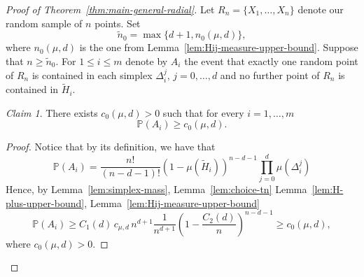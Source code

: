 \documentclass[10pt]{amsart}
\newcommand{\1}{\textbf{1}}
\numberwithin{equation}{section} %
\theoremstyle{remark}
\newtheorem{claim}{Claim}
\theoremstyle{definition}
\begin{document}
\begin{proof}[Proof of Theorem~\ref{thm:main-general-radial}]
Let $R_n=\{X_1,\ldots,X_n\}$ denote our random sample of $n$ points. Set \[\widetilde{n}_0= \max\{d+1,n_0(\mu,d)\},\] where $n_0(\mu,d)$ is the one from Lemma~\ref{lem:Hij-measure-upper-bound}. Suppose that $n \geq \widetilde{n}_0$. For $1 \leq i \leq m$ denote by $A_i$ the event that exactly one random point of $R_n$ is contained in each simplex $\Delta_i^j, \, j=0,\ldots,d$ and no further point of $R_n$ is contained in $\widetilde{H}_i$.

\begin{claim}\label{claim:A-events-lower-bound}
    There exists $c_0(\mu,d)>0$ such that for every $i=1,\ldots,m$ \[\mathbb{P}(A_i) \geq c_0(\mu,d).\]
\end{claim}

\begin{proof}
Notice that by its definition, we have that
\[
\mathbb P(A_i)
=
\frac{n!}{(n-d-1)!}
\left(1-\mu(\widetilde{H}_i)\right)^{n-d-1} \prod_{j=0}^d \mu(\Delta_i^j) \] Hence,  by Lemma~\ref{lem:simplex-mass}, Lemma~\ref{lem:choice-tn} Lemma~\ref{lem:H-plus-upper-bound}, Lemma~\ref{lem:Hij-measure-upper-bound}
\[
\mathbb{P}(A_i) \geq C_1(d)\,c_{\mu,d}\,  n^{d+1}\frac1{n^{d+1}}
\left(1-\frac {C_2(d)}{n}\right)^{n-d-1}
\ge c_0(\mu,d),
\]
where $c_0(\mu,d)>0$.
\end{proof}


\end{proof}
\end{document}
